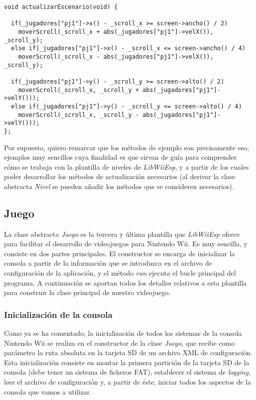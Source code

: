 \begin{lstlisting}[style=C++]
void actualizarEscenario(void) {

  if(_jugadores["pj1"]->x() - _scroll_x >= screen->ancho() / 2)
    moverScroll(_scroll_x + abs(_jugadores["pj1"]->velX()), _scroll_y);
  else if(_jugadores["pj1"]->x() - _scroll_x <= screen->ancho() / 4)
    moverScroll(_scroll_x - abs(_jugadores["pj1"]->velX()), _scroll_y);

  if(_jugadores["pj1"]->y() - _scroll_y >= screen->alto() / 2)
    moverScroll(_scroll_x, _scroll_y + abs(_jugadores["pj1"]->velY()));
  else if(_jugadores["pj1"]->y() - _scroll_y <= screen->alto() / 4)
    moverScroll(_scroll_x, _scroll_y - abs(_jugadores["pj1"]->velY()));
};
\end{lstlisting}

Por supuesto, quiero remarcar que los métodos de ejemplo son precisamente eso, ejemplos muy sencillos cuya finalidad es que sirvan de guía para comprender cómo se trabaja con la plantilla de niveles de \emph{LibWiiEsp}, y a partir de los cuales poder desarrollar los métodos de actualización necesarios (al derivar la clase abstracta \emph{Nivel} se pueden añadir los métodos que se consideren necesarios).

\subsection{Juego}

La clase abstracta \emph{Juego} es la tercera y última plantilla que \emph{LibWiiEsp} ofrece para facilitar el desarrollo de videojuegos para Nintendo Wii. Es muy sencilla, y consiste en dos partes principales. El constructor se encarga de inicializar la consola a partir de la información que se introduzca en el archivo de configuración de la aplicación, y el método \emph{run} ejecuta el bucle principal del programa. A continuación se aportan todos los detalles relativos a esta plantilla para construir la clase principal de nuestro videojuego.

\subsubsection{Inicialización de la consola}

Como ya se ha comentado, la inicialización de todos los sistemas de la consola Nintendo Wii se realiza en el constructor de la clase \emph{Juego}, que recibe como parámetro la ruta absoluta en la tarjeta SD de un archivo XML de configuración. Esta inicialización consiste en montar la primera partición de la tarjeta SD de la consola (debe tener un sistema de ficheros FAT), establecer el sistema de \emph{logging}, leer el archivo de configuración y, a partir de éste, iniciar todos los aspectos de la consola que vamos a utilizar.\\

